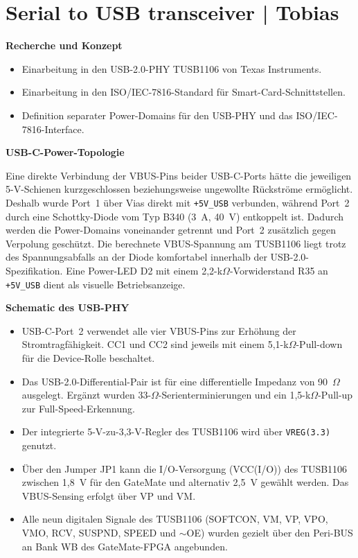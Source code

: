 \documentclass[a4paper,11pt]{article}
\begin{document}
\section{Serial to USB transceiver | Tobias}

\textbf{Recherche und Konzept}
\begin{itemize}
	\item Einarbeitung in den USB-2.0-PHY TUSB1106 von Texas Instruments.
	\item Einarbeitung in den ISO/IEC-7816-Standard für Smart-Card-Schnittstellen.
	\item Definition separater Power-Domains für den USB-PHY und das ISO/IEC-7816-Interface.
\end{itemize}

\textbf{USB-C-Power-Topologie}

Eine direkte Verbindung der VBUS-Pins beider USB-C-Ports hätte die jeweiligen 5-V-Schienen kurzgeschlossen beziehungsweise ungewollte Rückströme ermöglicht. Deshalb wurde Port~1 über Vias direkt mit \texttt{+5V\_USB} verbunden, während Port~2 durch eine Schottky-Diode vom Typ B340 (3~A, 40~V) entkoppelt ist. Dadurch werden die Power-Domains voneinander getrennt und Port~2 zusätzlich gegen Verpolung geschützt. Die berechnete VBUS-Spannung am TUSB1106 liegt trotz des Spannungsabfalls an der Diode komfortabel innerhalb der USB-2.0-Spezifikation. Eine Power-LED D2 mit einem 2,2-k$\Omega$-Vorwiderstand R35 an \texttt{+5V\_USB} dient als visuelle Betriebsanzeige.


\textbf{Schematic des USB-PHY}
\begin{itemize}
	\item USB-C-Port~2 verwendet alle vier VBUS-Pins zur Erhöhung der Stromtragfähigkeit. CC1 und CC2 sind jeweils mit einem 5,1-k$\Omega$-Pull-down für die Device-Rolle beschaltet.
	\item Das USB-2.0-Differential-Pair ist für eine differentielle Impedanz von 90~$\Omega$ ausgelegt. Ergänzt wurden 33-$\Omega$-Serienterminierungen und ein 1,5-k$\Omega$-Pull-up zur Full-Speed-Erkennung.
	\item Der integrierte 5-V-zu-3,3-V-Regler des TUSB1106 wird über \texttt{VREG(3.3)} genutzt.
	\item Über den Jumper JP1 kann die I/O-Versorgung (VCC(I/O)) des TUSB1106 zwischen 1,8~V für den GateMate und alternativ 2,5~V gewählt werden. Das VBUS-Sensing erfolgt über VP und VM.
	\item Alle neun digitalen Signale des TUSB1106 (SOFTCON, VM, VP, VPO, VMO, RCV, SUSPND, SPEED und $\sim$OE) wurden gezielt über den Peri-BUS an Bank WB des GateMate-FPGA angebunden.
\end{itemize}
\end{document}
